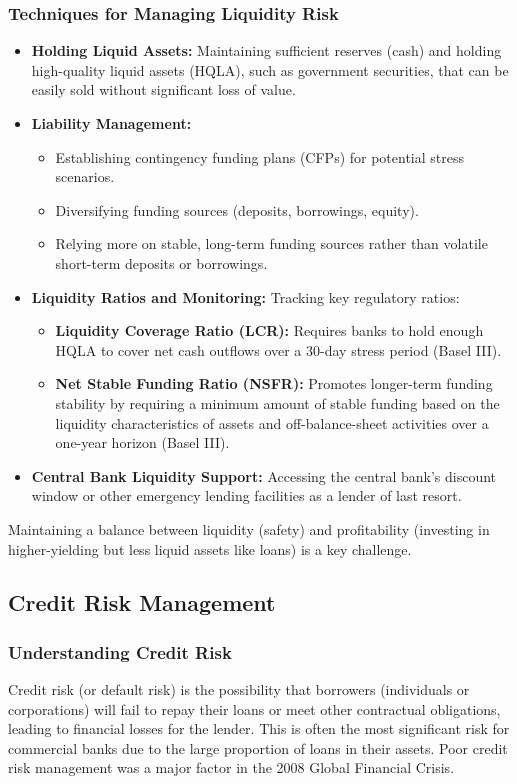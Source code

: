 \subsubsection{Techniques for Managing Liquidity Risk}
\begin{itemize}
    \item \textbf{Holding Liquid Assets:} Maintaining sufficient reserves (cash) and holding high-quality liquid assets (HQLA), such as government securities, that can be easily sold without significant loss of value.
    \item \textbf{Liability Management:}
        \begin{itemize}
            \item Establishing contingency funding plans (CFPs) for potential stress scenarios.
            \item Diversifying funding sources (deposits, borrowings, equity).
            \item Relying more on stable, long-term funding sources rather than volatile short-term deposits or borrowings.
        \end{itemize}
    \item \textbf{Liquidity Ratios and Monitoring:} Tracking key regulatory ratios:
        \begin{itemize}
            \item \textbf{Liquidity Coverage Ratio (LCR):} Requires banks to hold enough HQLA to cover net cash outflows over a 30-day stress period (Basel III).
            \item \textbf{Net Stable Funding Ratio (NSFR):} Promotes longer-term funding stability by requiring a minimum amount of stable funding based on the liquidity characteristics of assets and off-balance-sheet activities over a one-year horizon (Basel III).
        \end{itemize}
    \item \textbf{Central Bank Liquidity Support:} Accessing the central bank's discount window or other emergency lending facilities as a lender of last resort.
\end{itemize}
Maintaining a balance between liquidity (safety) and profitability (investing in higher-yielding but less liquid assets like loans) is a key challenge.

\subsection{Credit Risk Management}

\subsubsection{Understanding Credit Risk}
Credit risk (or default risk) is the possibility that borrowers (individuals or corporations) will fail to repay their loans or meet other contractual obligations, leading to financial losses for the lender. This is often the most significant risk for commercial banks due to the large proportion of loans in their assets. Poor credit risk management was a major factor in the 2008 Global Financial Crisis.

